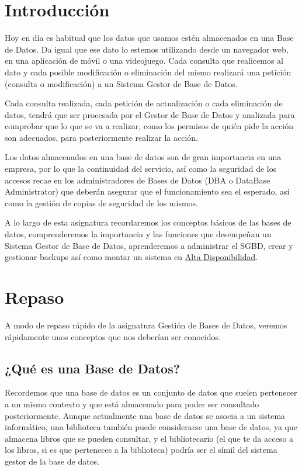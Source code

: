 \chapter{Introducción}

Hoy en día es habitual que los datos que usamos estén almacenados en una Base de Datos. Da igual que ese dato lo estemos utilizando desde un navegador web, en una aplicación de móvil o una videojuego. Cada consulta que realicemos al dato y cada posible modificación o eliminación del mismo realizará una petición (consulta o modificación) a un Sistema Gestor de Base de Datos.

Cada consulta realizada, cada petición de actualización o cada eliminación de datos, tendrá que ser procesada por el Gestor de Base de Datos y analizada para comprobar que lo que se va a realizar, como los permisos de quién pide la acción son adecuados, para posteriormente realizar la acción.

Los datos almacenados en una base de datos son de gran importancia en una empresa, por lo que la continuidad del servicio, así como la seguridad de los accesos recae en los administradores de Bases de Datos (DBA o DataBase Administrator) que deberán asegurar que el funcionamiento sea el esperado, así como la gestión de copias de seguridad de los mismos.

A lo largo de esta asignatura recordaremos los conceptos básicos de las bases de datos, comprenderemos la importancia y las funciones que desempeñan un Sistema Gestor de Base de Datos, aprenderemos a administrar el SGBD, crear y gestionar backups así como montar un sistema en \hyperlink{altadisponibilidad}{Alta Disponibilidad}.

\chapter{Repaso}
A modo de repaso rápido de la asignatura Gestión de Bases de Datos, veremos rápidamente unos conceptos que nos deberían ser conocidos.


\section{¿Qué es una Base de Datos?}
Recordemos que una base de datos es un conjunto de datos que suelen pertenecer a un mismo contexto y que está almacenado para poder ser consultado posteriormente. Aunque actualmente una base de datos se asocia a un sistema informático, una biblioteca también puede considerarse una base de datos, ya que almacena libros que se pueden consultar, y el bibliotecario (el que te da acceso a los libros, si es que perteneces a la biblioteca) podría ser el símil del sistema gestor de la base de datos.

